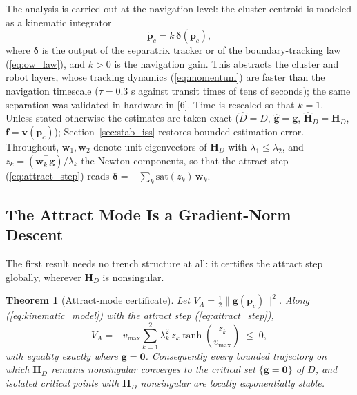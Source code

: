 \documentclass[lettersize,journal]{IEEEtran}
\newtheorem{theorem}{Theorem}
\begin{document}
The analysis is carried out at the navigation level: the cluster
centroid is modeled as a kinematic integrator
\begin{equation}
    \dot{\mathbf{p}}_c = k\,\boldsymbol{\delta}(\mathbf{p}_c),
    \label{eq:kinematic_model}
\end{equation}
where $\boldsymbol{\delta}$ is the output of the separatrix tracker or
of the boundary-tracking law (\ref{eq:ow_law}), and $k > 0$ is the
navigation gain. This abstracts the cluster and robot layers, whose
tracking dynamics (\ref{eq:momentum}) are faster than the navigation
timescale ($\tau = 0.3$ s against transit times of tens of seconds);
the same separation was validated in hardware in [6]. Time is rescaled
so that $k = 1$. Unless stated otherwise the estimates are taken exact
($\hat{D} = D$, $\hat{\mathbf{g}} = \mathbf{g}$, $\hat{\mathbf{H}}_D =
\mathbf{H}_D$, $\mathbf{f} = \mathbf{v}(\mathbf{p}_c)$);
Section~\ref{sec:stab_iss} restores bounded estimation error.
Throughout, $\mathbf{w}_1, \mathbf{w}_2$ denote unit eigenvectors of
$\mathbf{H}_D$ with $\lambda_1 \leq \lambda_2$, and $z_k =
(\mathbf{w}_k^\top \mathbf{g})/\lambda_k$ the Newton components, so
that the attract step (\ref{eq:attract_step}) reads
$\boldsymbol{\delta} = -\sum_k \mathrm{sat}(z_k)\,\mathbf{w}_k$.

\subsection{The Attract Mode Is a Gradient-Norm Descent}

The first result needs no trench structure at all: it certifies the attract step
globally, wherever $\mathbf{H}_D$ is nonsingular.

\begin{theorem}[Attract-mode certificate]
\label{thm:attract}
Let $V_A = \tfrac{1}{2}\|\mathbf{g}(\mathbf{p}_c)\|^2$. Along
(\ref{eq:kinematic_model}) with the attract step
(\ref{eq:attract_step}),
\begin{equation}
    \dot{V}_A = -v_{\max} \sum_{k=1}^{2} \lambda_k^2\,
    z_k \tanh\!\left(\frac{z_k}{v_{\max}}\right) \;\leq\; 0,
    \label{eq:VA_dot}
\end{equation}
with equality exactly where $\mathbf{g} = \mathbf{0}$. Consequently
every bounded trajectory on which $\mathbf{H}_D$ remains nonsingular
converges to the critical set $\{\mathbf{g} = \mathbf{0}\}$ of $D$, and
isolated critical points with $\mathbf{H}_D$ nonsingular are locally
exponentially stable.
\end{theorem}
\end{document}
